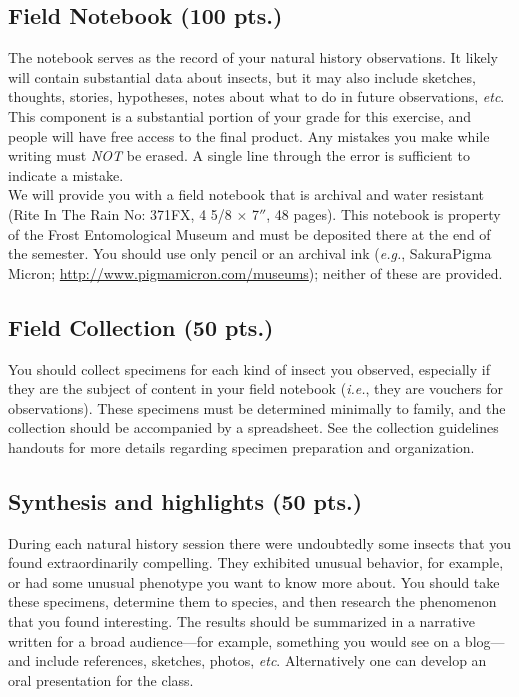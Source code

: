 \documentclass[letterpaper, 11pt]{article}
\begin{document}
\subsection*{Field Notebook (100 pts.)}
The notebook serves as the record of your natural history observations. It likely will contain substantial data about insects, but it may also include sketches, thoughts, stories, hypotheses, notes about what to do in future observations, \textit{etc}. This component is a substantial portion of your grade for this exercise, and people will have free access to the final product. Any mistakes you make while writing must \textit{NOT} be erased. A single line through the error is sufficient to indicate a mistake.\\

\noindent{}We will provide you with a field notebook that is archival and water resistant (Rite In The Rain No: 371FX, 4 5/8 $\times$ 7$''$, 48 pages). This notebook is property of the Frost Entomological Museum and must be deposited there at the end of the semester. You should use only pencil or an archival ink (\textit{e.g.}, Sakura\textregistered{ }Pigma Micron\textregistered; \url{http://www.pigmamicron.com/museums}); neither of these are provided. 

\subsection*{Field Collection (50 pts.)}
You should collect specimens for each kind of insect you observed, especially if they are the subject of content in your field notebook (\textit{i.e.}, they are vouchers for observations). These specimens must be determined minimally to family, and the collection should be accompanied by a spreadsheet. See the collection guidelines handouts for more details regarding specimen preparation and organization.

\subsection*{Synthesis and highlights (50 pts.)}
During each natural history session there were undoubtedly some insects that you found extraordinarily compelling. They exhibited unusual behavior, for example, or had some unusual phenotype you want to know more about. You should take these specimens, determine them to species, and then research the phenomenon that you found interesting. The results should be summarized in a narrative written for a broad audience---for example, something you would see on a blog---and include references, sketches, photos, \textit{etc}. Alternatively one can develop an oral presentation for the class.



\end{document}
